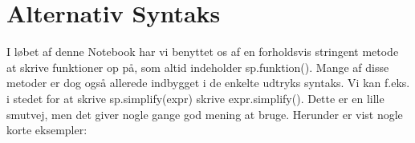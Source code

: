 \documentclass[letterpaper,10pt,english]{jupyterBook}
\begin{document}
\noindent{}

\begin{sphinxVerbatim}[commandchars=\\\{\}]
    
      

   
\end{sphinxVerbatim}

\noindent{}


\section{Alternativ Syntaks}
\label{\detokenize{notebooks/sympy/Notebook4:alternativ-syntaks}}
I løbet af denne Notebook har vi benyttet os af en forholdsvis stringent metode at skrive funktioner op på, som altid indeholder sp.funktion(). Mange af disse metoder er dog også allerede indbygget i de enkelte udtryks syntaks. Vi kan f.eks. i stedet for at skrive sp.simplify(expr) skrive expr.simplify(). Dette er en lille smutvej, men det giver nogle gange god mening at bruge. Herunder er vist nogle korte eksempler:

\begin{sphinxVerbatim}[commandchars=\\\{\}]
  

\end{sphinxVerbatim}

\noindent{}

\begin{sphinxVerbatim}[commandchars=\\\{\}]
\end{sphinxVerbatim}

\noindent{}
\end{document}
